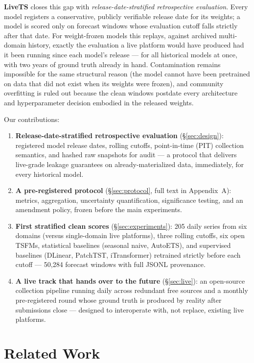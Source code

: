 \documentclass{article}
\begin{document}
\textbf{LiveTS} closes this gap with \emph{release-date-stratified retrospective evaluation}. Every model registers a conservative, publicly verifiable release date for its weights; a model is scored only on forecast windows whose evaluation cutoff falls strictly after that date. For weight-frozen models this replays, against archived multi-domain history, exactly the evaluation a live platform would have produced had it been running since each model's release --- for all historical models at once, with two years of ground truth already in hand. Contamination remains impossible for the same structural reason (the model cannot have been pretrained on data that did not exist when its weights were frozen), and community overfitting is ruled out because the clean windows postdate every architecture and hyperparameter decision embodied in the released weights.

Our contributions:
\begin{enumerate}
  \item \textbf{Release-date-stratified retrospective evaluation} (\S\ref{sec:design}): registered model release dates, rolling cutoffs, point-in-time (PIT) collection semantics, and hashed raw snapshots for audit --- a protocol that delivers live-grade leakage guarantees on already-materialized data, immediately, for every historical model.
  \item \textbf{A pre-registered protocol} (\S\ref{sec:protocol}, full text in Appendix~A): metrics, aggregation, uncertainty quantification, significance testing, and an amendment policy, frozen before the main experiments.
  \item \textbf{First stratified clean scores} (\S\ref{sec:experiments}): 205 daily series from six domains (versus single-domain live platforms), three rolling cutoffs, six open TSFMs, statistical baselines (seasonal naive, AutoETS), and supervised baselines (DLinear, PatchTST, iTransformer) retrained strictly before each cutoff --- 50{,}284 forecast windows with full JSONL provenance.
  \item \textbf{A live track that hands over to the future} (\S\ref{sec:live}): an open-source collection pipeline running daily across redundant free sources and a monthly pre-registered round whose ground truth is produced by reality after submissions close --- designed to interoperate with, not replace, existing live platforms.
\end{enumerate}

\section{Related Work}
\end{document}
